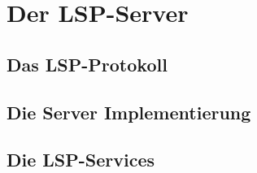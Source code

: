 \documentclass[./einleitung.tex]{subfiles}
\begin{document}
    \section{Der LSP-Server}\label{sec:der-lsp-server}
    \subsection{Das LSP-Protokoll}
    \subsection{Die Server Implementierung}
    \subsection{Die LSP-Services}
\end{document}
